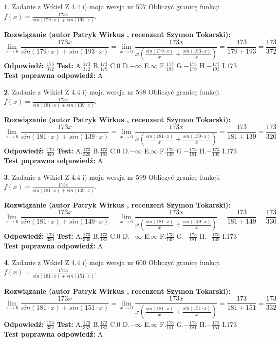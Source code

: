\documentclass[12pt, a4paper]{article}
\theoremstyle{definition} %
\newtheorem{zad}{}
\newcommand{\zadStart}[1]{\begin{zad}#1\newline}
\newcommand{\zadStop}{\end{zad}}
\newcommand{\rozwStart}[2]{\noindent \textbf{Rozwiązanie (autor #1 , recenzent #2): }\newline}
\newcommand{\rozwStop}{\newline}
\newcommand{\odpStart}{\noindent \textbf{Odpowiedź:}\newline}
\newcommand{\odpStop}{\newline}
\newcommand{\testStart}{\noindent \textbf{Test:}\newline}
\newcommand{\testStop}{\newline}
\newcommand{\kluczStart}{\noindent \textbf{Test poprawna odpowiedź:}\newline}
\newcommand{\kluczStop}{\newline}
\begin{document}
\zadStart{Zadanie z Wikieł Z 4.4 i) moja wersja nr 597}
Obliczyć granicę funkcji $f(x)=\frac{173x}{sin(179\cdot x) +sin(193\cdot x)}$.
\zadStop
\rozwStart{Patryk Wirkus}{Szymon Tokarski}
$$\lim\limits_{x\to 0}\frac{173x}{sin(179\cdot x) +sin(193\cdot x)}=\lim\limits_{x\to 0}\frac{173x}{x(\frac{sin(179\cdot x)}{x}+\frac{sin(193\cdot x)}{x})}=\frac{173}{179+193} = \frac{173}{372}$$
\rozwStop
\odpStart
$\frac{173}{372}$
\odpStop
\testStart
A.$\frac{173}{372}$
B.$\frac{173}{179}$
C.$0$
D.$-\infty$
E.$\infty$
F.$\frac{173}{193}$
G.$-\frac{173}{179}$
H.$-\frac{173}{193}$
I.$173$
\testStop
\kluczStart
A
\kluczStop



\zadStart{Zadanie z Wikieł Z 4.4 i) moja wersja nr 598}
Obliczyć granicę funkcji $f(x)=\frac{173x}{sin(181\cdot x) +sin(139\cdot x)}$.
\zadStop
\rozwStart{Patryk Wirkus}{Szymon Tokarski}
$$\lim\limits_{x\to 0}\frac{173x}{sin(181\cdot x) +sin(139\cdot x)}=\lim\limits_{x\to 0}\frac{173x}{x(\frac{sin(181\cdot x)}{x}+\frac{sin(139\cdot x)}{x})}=\frac{173}{181+139} = \frac{173}{320}$$
\rozwStop
\odpStart
$\frac{173}{320}$
\odpStop
\testStart
A.$\frac{173}{320}$
B.$\frac{173}{181}$
C.$0$
D.$-\infty$
E.$\infty$
F.$\frac{173}{139}$
G.$-\frac{173}{181}$
H.$-\frac{173}{139}$
I.$173$
\testStop
\kluczStart
A
\kluczStop



\zadStart{Zadanie z Wikieł Z 4.4 i) moja wersja nr 599}
Obliczyć granicę funkcji $f(x)=\frac{173x}{sin(181\cdot x) +sin(149\cdot x)}$.
\zadStop
\rozwStart{Patryk Wirkus}{Szymon Tokarski}
$$\lim\limits_{x\to 0}\frac{173x}{sin(181\cdot x) +sin(149\cdot x)}=\lim\limits_{x\to 0}\frac{173x}{x(\frac{sin(181\cdot x)}{x}+\frac{sin(149\cdot x)}{x})}=\frac{173}{181+149} = \frac{173}{330}$$
\rozwStop
\odpStart
$\frac{173}{330}$
\odpStop
\testStart
A.$\frac{173}{330}$
B.$\frac{173}{181}$
C.$0$
D.$-\infty$
E.$\infty$
F.$\frac{173}{149}$
G.$-\frac{173}{181}$
H.$-\frac{173}{149}$
I.$173$
\testStop
\kluczStart
A
\kluczStop



\zadStart{Zadanie z Wikieł Z 4.4 i) moja wersja nr 600}
Obliczyć granicę funkcji $f(x)=\frac{173x}{sin(181\cdot x) +sin(151\cdot x)}$.
\zadStop
\rozwStart{Patryk Wirkus}{Szymon Tokarski}
$$\lim\limits_{x\to 0}\frac{173x}{sin(181\cdot x) +sin(151\cdot x)}=\lim\limits_{x\to 0}\frac{173x}{x(\frac{sin(181\cdot x)}{x}+\frac{sin(151\cdot x)}{x})}=\frac{173}{181+151} = \frac{173}{332}$$
\rozwStop
\odpStart
$\frac{173}{332}$
\odpStop
\testStart
A.$\frac{173}{332}$
B.$\frac{173}{181}$
C.$0$
D.$-\infty$
E.$\infty$
F.$\frac{173}{151}$
G.$-\frac{173}{181}$
H.$-\frac{173}{151}$
I.$173$
\testStop
\kluczStart
A
\kluczStop
\end{document}
